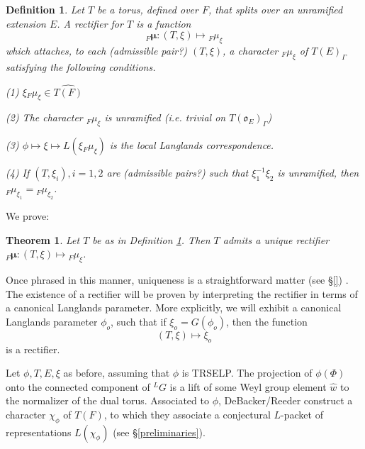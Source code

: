 \documentclass[11pt]{amsart}
\theoremstyle{plain}
\newtheorem{theorem}[enumi]{Theorem}
\newtheorem{definition}[enumi]{Definition}
\begin{document}
\begin{definition}\label{rectifierdefinition}
Let $T$ be a torus, defined over $F$, that splits over an unramified extension $E$.  A \emph{rectifier} for $T$ is a function $${}_F \boldsymbol\mu : (T, \xi) \mapsto {}_F \mu_{\xi}$$
which attaches, to each (admissible pair?) $(T, \xi)$, a character ${}_F \mu_{\xi}$ of $T(E)_{\Gamma}$ satisfying the following conditions.

(1) $\xi {}_F \mu_{\xi} \in \widehat{T(F)}$

(2) The character ${}_F \mu_{\xi}$ is unramified (i.e. trivial on $T(\mathfrak{o}_E)_{\Gamma}$)

(3) $\phi \mapsto \xi \mapsto L(\xi {}_F \mu_{\xi})$ is the local Langlands correspondence.

(4) If $(T, \xi_i), i = 1,2$ are (admissible pairs?)  such that $\xi_1^{-1} \xi_2$ is unramified, then ${}_F \mu_{\xi_1} = {}_F \mu_{\xi_2}$.
\end{definition}

We prove:

\begin{theorem} Let $T$ be as in Definition \ref{rectifierdefinition}.  Then $T$ admits a unique rectifier ${}_F \boldsymbol\mu : (T, \xi) \mapsto {}_F \mu_{\xi}$.
\end{theorem}

Once phrased in this manner, uniqueness is a straightforward matter (see \S\ref{}) .  The existence of a rectifier will be proven by interpreting the rectifier in terms of a canonical Langlands parameter.  More explicitly, we will exhibit a canonical  Langlands parameter $\phi_{o}$, such that if $\xi_o = G(\phi_o)$, then the function $$(T, \xi) \mapsto \xi_o$$ is a rectifier.

Let $\phi, T, E, \xi$ as before, assuming that $\phi$ is TRSELP.   The projection of $\phi(\Phi)$ onto the connected component of ${}^L G$ is a lift of some Weyl group element $\hat{w}$ to the normalizer of the dual torus.  Associated to $\phi$, DeBacker/Reeder construct a character $\chi_{\phi}$ of $T(F)$, to which they associate a conjectural $L$-packet of representations $L(\chi_{\phi})$ (see \S \ref{preliminaries}).
\end{document}
